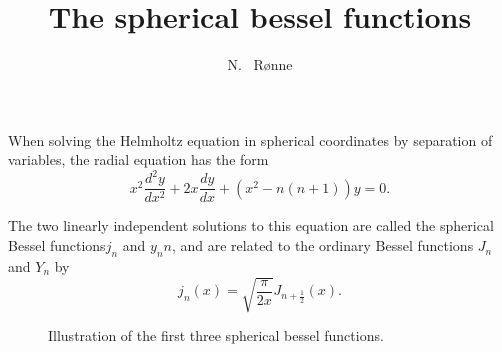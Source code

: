 \documentclass[twocolumn]{article}
\title{The spherical bessel functions}
\author{N. ~R\o nne}
\begin{document}
\maketitle

\noindent
When solving the Helmholtz equation in spherical coordinates by separation of variables, the radial equation has the form
\begin{equation}
  x^2 \frac{d^2 y}{dx^2} + 2x \frac{dy}{dx} + \left(x^2 - n(n + 1)\right) y = 0.
\end{equation}

The two linearly independent solutions to this equation are called the spherical Bessel functions$j_n$ and $y_nn$, and are related to the ordinary Bessel functions $J_n$ and $Y_n$ by
\begin{equation}
  j_n(x) = \sqrt{\frac{\pi}{2x}} J_{n+\frac{1}{2}}(x).
\end{equation}




\begin{figure}[h]
  
  \caption{Illustration of the first three spherical bessel functions.}
\end{figure}
\end{document}
